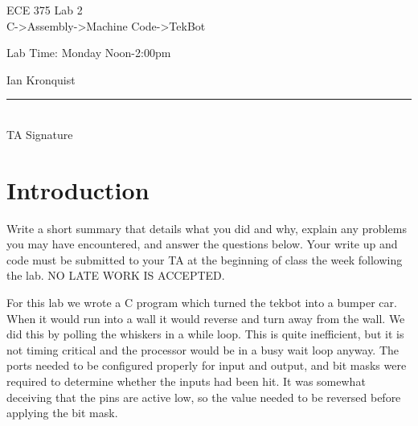 \documentclass[12pt,letterpaper]{article}
\begin{document}
\begin{titlepage}
    \vspace*{4cm}
    \begin{flushright}
    {\huge
        ECE 375 Lab 2\\[1cm]
    }
    {\large
         C->Assembly->Machine Code->TekBot
    }
    \end{flushright}
    \begin{flushleft}
    Lab Time: Monday Noon-2:00pm
    \end{flushleft}
    \begin{flushright}
    Ian Kronquist
    \vfill
    \rule{5in}{.5mm}\\
    TA Signature
    \end{flushright}

\end{titlepage}

\section{Introduction}
Write a short summary that details what you did and why, explain any problems you may have encountered, and answer the questions below. Your write up and code must be submitted to your TA at the beginning of class the week following the lab. NO LATE WORK IS ACCEPTED.

For this lab we wrote a C program which turned the tekbot into a bumper car. When it would run into a wall it would reverse and turn away from the wall. We did this by polling the whiskers in a while loop. This is quite inefficient, but it is not timing critical and the processor would be in a busy wait loop anyway. The ports needed to be configured properly for input and output, and bit masks were required to determine whether the inputs had been hit. It was somewhat deceiving that the pins are active low, so the value needed to be reversed before applying the bit mask.
\end{document}
